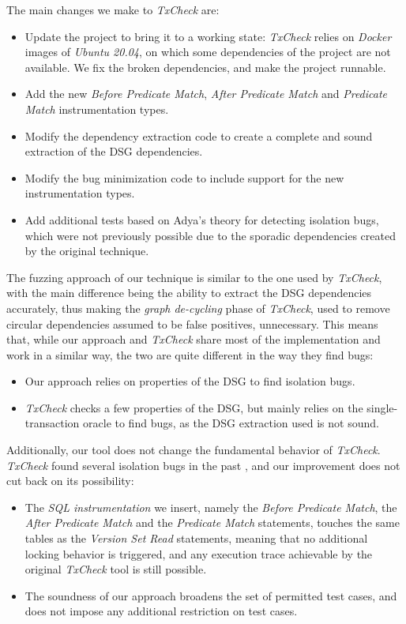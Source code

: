 The main changes we make to \textit{TxCheck} are:
\begin{itemize}
    \item Update the project to bring it to a working state: \textit{TxCheck} relies on \textit{Docker} images of \textit{Ubuntu 20.04}, on which some dependencies of the project are not available. We fix the broken dependencies, and make the project runnable.
    \item Add the new \textit{Before Predicate Match}, \textit{After Predicate Match} and \textit{Predicate Match} instrumentation types.
    \item Modify the dependency extraction code to create a complete and sound extraction of the DSG dependencies.
    \item Modify the bug minimization code to include support for the new instrumentation types.
    \item Add additional tests based on Adya's theory \cite{adya1999weak} for detecting isolation bugs, which were not previously possible due to the sporadic dependencies created by the original technique.
\end{itemize}

The fuzzing approach of our technique is similar to the one used by \textit{TxCheck}, with the main difference being the ability to extract the DSG dependencies accurately, thus making the \textit{graph de-cycling} phase of \textit{TxCheck}, used to remove circular dependencies assumed to be false positives, unnecessary. This means that, while our approach and \textit{TxCheck} share most of the implementation and work in a similar way, the two are quite different in the way they find bugs:
\begin{itemize}
    \item Our approach relies on properties of the DSG to find isolation bugs.
    \item \textit{TxCheck} checks a few properties of the DSG, but mainly relies on the single-transaction oracle to find bugs, as the DSG extraction used is not sound.
\end{itemize}

Additionally, our tool does not change the fundamental behavior of \textit{TxCheck}. \textit{TxCheck} found several isolation bugs in the past \cite{jiang2023detecting}, and our improvement does not cut back on its possibility:
\begin{itemize}
    \item The \textit{SQL instrumentation} we insert, namely the \textit{Before Predicate Match}, the \textit{After Predicate Match} and the \textit{Predicate Match} statements, touches the same tables as the \textit{Version Set Read} statements, meaning that no additional locking behavior is triggered, and any execution trace achievable by the original \textit{TxCheck} tool is still possible.
    \item The soundness of our approach broadens the set of permitted test cases, and does not impose any additional restriction on test cases.
\end{itemize}

